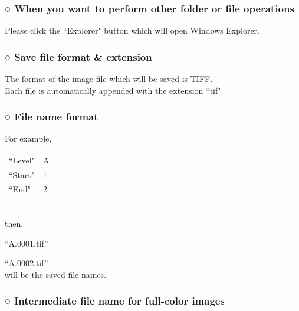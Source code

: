 \documentclass[a4paper,10pt]{article}
\begin{document}
\subsubsection*{○ When you want to perform other folder or file operations}

\noindent Please click the “Explorer" button which will open Windows Explorer.\\

\subsubsection*{○ Save file format \& extension}

\noindent The format of the image file which will be saved is TIFF.\\
Each file is automatically appended with the extension “tif".\\

\subsubsection*{○ File name format}

\noindent For example,\\[-1.25em]

\setlength{\tabcolsep}{0em}
\renewcommand{\arraystretch}{1.0}
\begin{tabular}{p{8.5em}l}
“Level" & A\\
“Start" & 1\\
“End" & 2\\
\end{tabular}\\[-0.5em]

\noindent then,\par
“A.0001.tif”\par
“A.0002.tif”\\
will be the saved file names.\\

\subsubsection*{○ Intermediate file name for full-color images}
\end{document}
